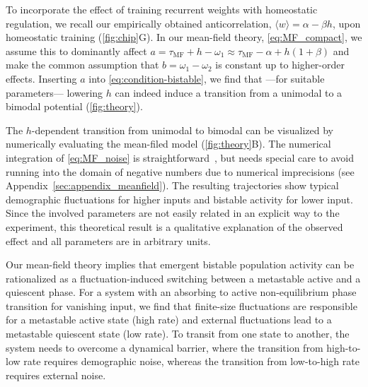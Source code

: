 To incorporate the effect of training recurrent weights with homeostatic regulation, we recall our empirically obtained anticorrelation, $\langle w \rangle = \alpha - \beta h$, upon homeostatic training (\cref{fig:chip}G).
In our mean-field theory, \cref{eq:MF_compact}, we assume this to dominantly affect $a=\tau_\mathrm{MF} + h - \omega_1 \approx \tau_\mathrm{MF}  - \alpha + h(1+\beta)$ and make the common assumption that $b=\omega_1-\omega_2$ is constant up to higher-order effects.
Inserting $a$ into \cref{eq:condition-bistable}, we find that ---for suitable parameters--- lowering $h$ can indeed induce a transition from a unimodal to a bimodal potential (\cref{fig:theory}).

The $h$-dependent transition from unimodal to bimodal can be visualized by numerically evaluating the mean-filed model (\cref{fig:theory}B).
The numerical integration of \cref{eq:MF_noise} is straightforward~\cite{dornic_integration_2005}, but needs special care to avoid running into the domain of negative numbers due to numerical imprecisions (see Appendix~\ref{sec:appendix_meanfield}).
The resulting trajectories show typical demographic fluctuations for higher inputs and bistable activity for lower input.
Since the involved parameters are not easily related in an explicit way to the experiment, this theoretical result is a qualitative explanation of the observed effect and all parameters are in arbitrary units.

Our mean-field theory implies that emergent bistable population activity can be rationalized as a fluctuation-induced switching between a metastable active and a quiescent phase.
For a system with an absorbing to active non-equilibrium phase transition for vanishing input, we find that finite-size fluctuations are responsible for a metastable active state (high rate) and external fluctuations lead to a metastable quiescent state (low rate).
To transit from one state to another, the system needs to overcome a dynamical barrier, where the transition from high-to-low rate requires demographic noise, whereas the transition from low-to-high rate requires external noise.
